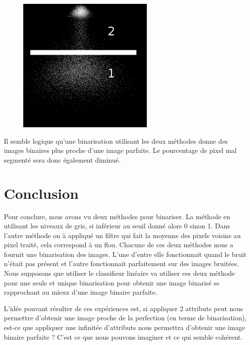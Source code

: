 \documentclass[a4paper,12pt]{report}
\begin{document}
\begin{figure}[htp]
	\includegraphics[scale=0.35]{image/hd41.png}
\end{figure}

Il semble logique qu'une binarisation utilisant les deux méthodes donne des images binaires plus proche d'une image parfaite. Le pourcentage de pixel mal segmenté sera donc également diminué.

\section*{Conclusion}

Pour conclure, nous avons vu deux méthodes pour binariser. La méthode en utilisant les niveaux de gris, si inférieur au seuil donné alors 0 sinon 1. Dans l'autre méthode on à appliqué un filtre qui fait la moyenne des pixels voisins au pixel traité, cela correspond à un flou. Chacune de ces deux méthodes nous a fournit une binarisation des images. L'une d'entre elle fonctionnait quand le bruit n'était pas présent et l'autre fonctionnait parfaitement sur des images bruitées. Nous supposons que utiliser le classifieur linéaire va utiliser ces deux méthode pour une seule et unique binarisation pour obtenir une image binarisé se rapprochant au  mieux d'une image binaire parfaite. 

L'idée pouvant résulter de ces expériences est, si appliquer 2 attributs peut nous permettre d'obtenir une image proche de la perfection (en terme de binarisation), est-ce que appliquer une infinitée d'attributs nous permettra d'obtenir une image binaire parfaite ? C'est ce que nous pouvons imaginer et ce qui semble cohérent.
\end{document}
